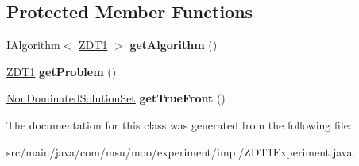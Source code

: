 \subsection*{Protected Member Functions}
\begin{DoxyCompactItemize}
\item 
\hypertarget{classcom_1_1msu_1_1moo_1_1experiment_1_1impl_1_1ZDT1Experiment_afa6fcc19c63e6b2dc11af8fd071a6c59}{I\-Algorithm$<$ \hyperlink{classcom_1_1msu_1_1moo_1_1problems_1_1ZDT1}{Z\-D\-T1} $>$ {\bfseries get\-Algorithm} ()}\label{classcom_1_1msu_1_1moo_1_1experiment_1_1impl_1_1ZDT1Experiment_afa6fcc19c63e6b2dc11af8fd071a6c59}

\item 
\hypertarget{classcom_1_1msu_1_1moo_1_1experiment_1_1impl_1_1ZDT1Experiment_a3c41fa78fcfb88fb3842c66775662f2f}{\hyperlink{classcom_1_1msu_1_1moo_1_1problems_1_1ZDT1}{Z\-D\-T1} {\bfseries get\-Problem} ()}\label{classcom_1_1msu_1_1moo_1_1experiment_1_1impl_1_1ZDT1Experiment_a3c41fa78fcfb88fb3842c66775662f2f}

\item 
\hypertarget{classcom_1_1msu_1_1moo_1_1experiment_1_1impl_1_1ZDT1Experiment_ac9c90e3223196c82152a65c344068730}{\hyperlink{classcom_1_1msu_1_1moo_1_1model_1_1solution_1_1NonDominatedSolutionSet}{Non\-Dominated\-Solution\-Set} {\bfseries get\-True\-Front} ()}\label{classcom_1_1msu_1_1moo_1_1experiment_1_1impl_1_1ZDT1Experiment_ac9c90e3223196c82152a65c344068730}

\end{DoxyCompactItemize}


The documentation for this class was generated from the following file\-:\begin{DoxyCompactItemize}
\item 
src/main/java/com/msu/moo/experiment/impl/Z\-D\-T1\-Experiment.\-java\end{DoxyCompactItemize}
